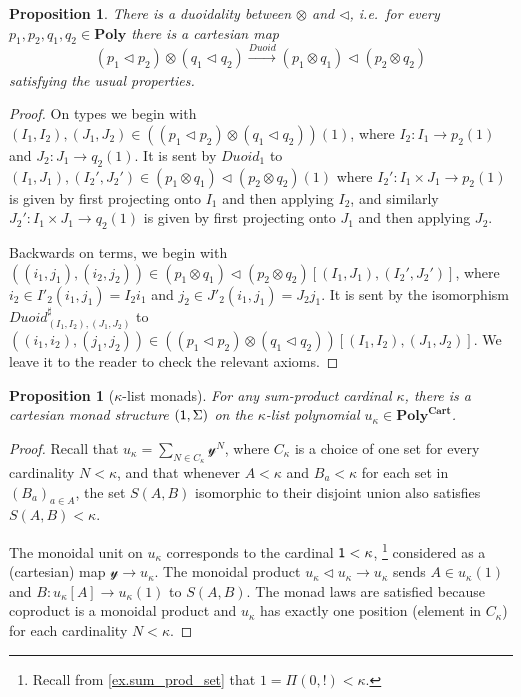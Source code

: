 \documentclass[11pt, one side, article]{memoir}
\theoremstyle{definition}
\theoremstyle{plain}
\newtheorem{proposition}[definitionx]{Proposition}
\newtheorem{lemma}[definitionx]{Lemma}
\newcommand{\Cat}[1]{\mathbf{#1}}%
\newcommand{\Fun}[1]{\mathit{#1}}%
\newcommand{\To}[2][]{\xrightarrow[#1]{#2}}
\newcommand{\yon}{\mathcal{y}}
\newcommand{\poly}{\Cat{Poly}}
\newcommand{\polycart}{\poly^{\Cat{Cart}}}
\newcommand{\0}{\textsf{0}}
\newcommand{\1}{\tn{\textsf{1}}}
\newcommand{\tri}{\mathbin{\triangleleft}}
\newcommand{\indep}{\Fun{Indep}}
\newcommand{\duoid}{\Fun{Duoid}}
\begin{document}
\begin{proposition}\label{prop.duoidal}
There is a duoidality between $\otimes$ and $\tri$, i.e.\ for every $p_1,p_2,q_1,q_2\in\poly$ there is a cartesian map
\[
	(p_1\tri p_2)\otimes(q_1\tri q_2)\To{\duoid} (p_1\otimes q_1)\tri (p_2\otimes q_2)
\]
satisfying the usual properties.
\end{proposition}
\begin{proof}
On types we begin with $(I_1, I_2),(J_1, J_2)\in ((p_1\tri p_2)\otimes(q_1\tri q_2))(1)$, where $I_2\colon I_1\to p_2(1)$ and $J_2\colon J_1\to q_2(1)$. It is sent by $\duoid_1$ to $(I_1,J_1),(I_2',J_2')\in (p_1\otimes q_1)\tri (p_2\otimes q_2)(1)$ where $I_2'\colon I_1\times J_1\to p_2(1)$ is given by first projecting onto $I_1$ and then applying $I_2$, and similarly $J_2'\colon I_1\times J_1\to q_2(1)$ is given by first projecting onto $J_1$ and then applying $J_2$. 

Backwards on terms, we begin with $((i_1,j_1),(i_2,j_2))\in (p_1\otimes q_1)\tri (p_2\otimes q_2)[(I_1,J_1),(I_2',J_2')]$, where $i_2\in I'_2(i_1,j_1)=I_2 i_1$ and $j_2\in J'_2(i_1,j_1)=J_2 j_1$. It is sent by the isomorphism $\duoid^\sharp_{(I_1, I_2),(J_1, J_2)}$ to $((i_1,i_2),(j_1,j_2))\in ((p_1\tri p_2)\otimes(q_1\tri q_2))[(I_1, I_2),(J_1, J_2)]$. We leave it to the reader to check the relevant axioms.
\end{proof}
%
%

\begin{proposition}[$\kappa$-list monads]\label{prop.list_monad}
For any sum-product cardinal $\kappa$, there is a cartesian monad structure $(\1,\Sigma)$ on the $\kappa$-list polynomial $u_\kappa\in\polycart$.
\end{proposition}
\begin{proof}
Recall that $u_\kappa=\sum_{N\in C_\kappa}\yon^N$, where $C_\kappa$ is a choice of one set for every cardinality $N<\kappa$, and that whenever $A<\kappa$ and $B_a<\kappa$ for each set in $(B_a)_{a\in A}$, the set $S(A,B)$ isomorphic to their disjoint union also satisfies $S(A,B)<\kappa$. 

The monoidal unit on $u_\kappa$ corresponds to the cardinal $\1<\kappa$,%
\footnote{
Recall from \cref{ex.sum_prod_set} that $1=\Pi(0,!)<\kappa$.
}
considered as a (cartesian) map $\yon\to u_\kappa$. The monoidal product $u_\kappa\tri u_\kappa\to u_\kappa$ sends $A\in u_\kappa(1)$ and $B\colon u_\kappa[A]\to u_\kappa(1)$ to $S(A,B)$. The monad laws are satisfied because coproduct is a monoidal product and $u_\kappa$ has exactly one position (element in $C_\kappa$) for each cardinality $N<\kappa$. 
\end{proof}
\end{document}
